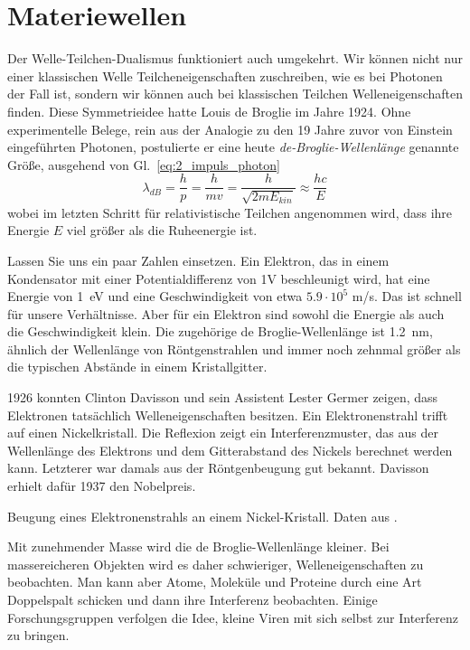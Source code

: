  \section{Materiewellen}

 Der Welle-Teilchen-Dualismus funktioniert auch umgekehrt. Wir können nicht nur einer klassischen Welle Teilcheneigenschaften zuschreiben, wie es bei Photonen der Fall ist, sondern wir können auch bei klassischen Teilchen Welleneigenschaften finden. Diese Symmetrieidee hatte Louis de Broglie im Jahre 1924. Ohne experimentelle Belege, rein aus der Analogie zu den 19 Jahre zuvor von Einstein eingeführten Photonen, postulierte er eine heute \emph{de-Broglie-Wellenlänge} genannte Größe, ausgehend von Gl.~\ref{eq:2_impuls_photon}
 \begin{equation}
     \lambda_{dB} = \frac{h}{p} = \frac{h}{m v} = \frac{h}{\sqrt{2 m E_{kin}}} \approx \frac{h c}{E}
 \end{equation}
 wobei im letzten Schritt für relativistische Teilchen angenommen wird, dass ihre Energie $E$ viel größer als die Ruheenergie ist.
 
 
 Lassen Sie uns ein paar Zahlen einsetzen. Ein Elektron, das in einem Kondensator mit einer Potentialdifferenz von \si{1}{V} beschleunigt wird, hat eine Energie von 1~eV und eine Geschwindigkeit von etwa $5.9 \cdot 10^5$ m/s. Das ist schnell für unsere Verhältnisse. Aber für ein Elektron sind sowohl die Energie als auch die Geschwindigkeit klein. Die zugehörige de Broglie-Wellenlänge ist 1.2~nm, ähnlich der Wellenlänge von Röntgenstrahlen und immer noch zehnmal größer als die typischen Abstände in einem Kristallgitter.

 1926 konnten Clinton Davisson und sein Assistent Lester Germer zeigen, dass Elektronen tatsächlich Welleneigenschaften besitzen.
 Ein Elektronenstrahl trifft auf einen Nickelkristall. Die Reflexion zeigt ein Interferenzmuster, das aus der Wellenlänge des Elektrons und dem Gitterabstand des Nickels berechnet werden kann. Letzterer war damals aus der Röntgenbeugung gut bekannt. Davisson erhielt dafür 1937 den Nobelpreis.
 
 \begin{marginfigure}
    \caption{Beugung eines Elektronenstrahls an einem Nickel-Kristall. Daten aus \cite{Davisson27}.}
\end{marginfigure}


 Mit zunehmender Masse wird die de Broglie-Wellenlänge kleiner. Bei massereicheren Objekten wird es daher schwieriger, Welleneigenschaften zu beobachten. Man kann aber Atome, Moleküle und Proteine durch eine Art Doppelspalt schicken und dann ihre Interferenz beobachten. Einige Forschungsgruppen verfolgen die Idee, kleine Viren mit sich selbst zur Interferenz zu bringen.


